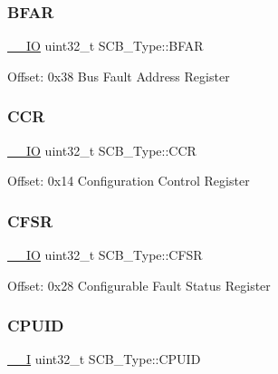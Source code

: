 \subsubsection{\texorpdfstring{BFAR}{BFAR}}
{\footnotesize\ttfamily \mbox{\hyperlink{group___c_m_s_i_s___c_m3__core__definitions_gaec43007d9998a0a0e01faede4133d6be}{\+\_\+\+\_\+\+IO}} uint32\+\_\+t S\+C\+B\+\_\+\+Type\+::\+B\+F\+AR}

Offset\+: 0x38 Bus Fault Address Register ~\newline
 \mbox{\label{struct_s_c_b___type_a6d273c6b90bad15c91dfbbad0f6e92d8}} 
\subsubsection{\texorpdfstring{CCR}{CCR}}
{\footnotesize\ttfamily \mbox{\hyperlink{group___c_m_s_i_s___c_m3__core__definitions_gaec43007d9998a0a0e01faede4133d6be}{\+\_\+\+\_\+\+IO}} uint32\+\_\+t S\+C\+B\+\_\+\+Type\+::\+C\+CR}

Offset\+: 0x14 Configuration Control Register ~\newline
 \mbox{\label{struct_s_c_b___type_a2f94bf549b16fdeb172352e22309e3c4}} 
\subsubsection{\texorpdfstring{CFSR}{CFSR}}
{\footnotesize\ttfamily \mbox{\hyperlink{group___c_m_s_i_s___c_m3__core__definitions_gaec43007d9998a0a0e01faede4133d6be}{\+\_\+\+\_\+\+IO}} uint32\+\_\+t S\+C\+B\+\_\+\+Type\+::\+C\+F\+SR}

Offset\+: 0x28 Configurable Fault Status Register ~\newline
 \mbox{\label{struct_s_c_b___type_afa7a9ee34dfa1da0b60b4525da285032}} 
\subsubsection{\texorpdfstring{CPUID}{CPUID}}
{\footnotesize\ttfamily \mbox{\hyperlink{group___c_m_s_i_s___c_m3__core__definitions_gaf63697ed9952cc71e1225efe205f6cd3}{\+\_\+\+\_\+I}} uint32\+\_\+t S\+C\+B\+\_\+\+Type\+::\+C\+P\+U\+ID}

